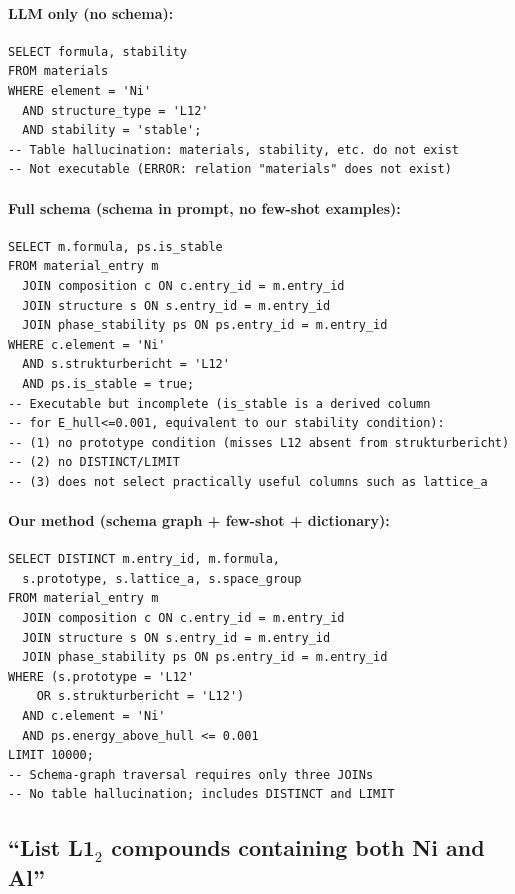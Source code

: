 \paragraph{LLM only (no schema):}
\begin{lstlisting}[basicstyle=\ttfamily\scriptsize,breaklines=true]
SELECT formula, stability
FROM materials
WHERE element = 'Ni'
  AND structure_type = 'L12'
  AND stability = 'stable';
-- Table hallucination: materials, stability, etc. do not exist
-- Not executable (ERROR: relation "materials" does not exist)
\end{lstlisting}

\paragraph{Full schema (schema in prompt, no few-shot examples):}
\begin{lstlisting}[basicstyle=\ttfamily\scriptsize,breaklines=true]
SELECT m.formula, ps.is_stable
FROM material_entry m
  JOIN composition c ON c.entry_id = m.entry_id
  JOIN structure s ON s.entry_id = m.entry_id
  JOIN phase_stability ps ON ps.entry_id = m.entry_id
WHERE c.element = 'Ni'
  AND s.strukturbericht = 'L12'
  AND ps.is_stable = true;
-- Executable but incomplete (is_stable is a derived column
-- for E_hull<=0.001, equivalent to our stability condition):
-- (1) no prototype condition (misses L12 absent from strukturbericht)
-- (2) no DISTINCT/LIMIT
-- (3) does not select practically useful columns such as lattice_a
\end{lstlisting}

\paragraph{Our method (schema graph + few-shot + dictionary):}
\begin{lstlisting}[basicstyle=\ttfamily\scriptsize,breaklines=true]
SELECT DISTINCT m.entry_id, m.formula,
  s.prototype, s.lattice_a, s.space_group
FROM material_entry m
  JOIN composition c ON c.entry_id = m.entry_id
  JOIN structure s ON s.entry_id = m.entry_id
  JOIN phase_stability ps ON ps.entry_id = m.entry_id
WHERE (s.prototype = 'L12'
    OR s.strukturbericht = 'L12')
  AND c.element = 'Ni'
  AND ps.energy_above_hull <= 0.001
LIMIT 10000;
-- Schema-graph traversal requires only three JOINs
-- No table hallucination; includes DISTINCT and LIMIT
\end{lstlisting}

\subsection{``List L1$_2$ compounds containing both Ni and Al''}

